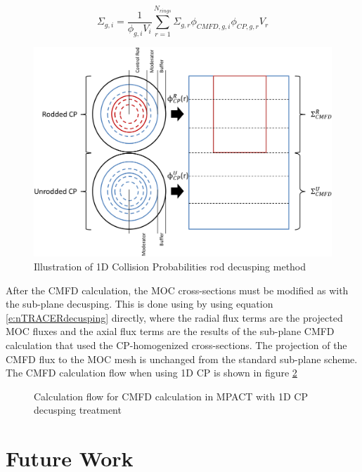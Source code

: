 \begin{equation}\label{e:CPMxs}
\Sigma_{g,i}=\frac{1}{\phi_{g,i}V_i}\sum_{r=1}^{N_{rings}} \Sigma_{g,r} \phi_{CMFD,g,i} \phi_{CP,g,r} V_r
\end{equation}

\begin{figure}
  \centering
  \includegraphics[width=\textwidth]{figs/CPdecusp.png}
  \caption[Collision Probabilities Decusping]{Illustration of 1D Collision Probabilities rod decusping method}\label{f:CPdecusp}
\end{figure}

After the CMFD calculation, the MOC cross-sections must be modified as with the sub-plane decusping.  This is done using by using equation \ref{e:nTRACERdecusping} directly, where the radial flux terms are the projected MOC fluxes and the axial flux terms are the results of the sub-plane CMFD calculation that used the CP-homogenized cross-sections.  The projection of the CMFD flux to the MOC mesh is unchanged from the standard sub-plane scheme.  The CMFD calculation flow when using 1D CP is shown in figure \ref{f:1dcpm-flowchart}

\begin{figure}
  \centering
  
  \caption[Stuff]{Calculation flow for CMFD calculation in MPACT with 1D CP decusping treatment}\label{f:1dcpm-flowchart}
\end{figure}

\section{Future Work}

